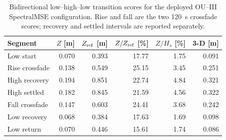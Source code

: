 \begin{table}[t]
  \centering
  \caption{Bidirectional low--high--low transition scores for the deployed OU--III SpectralMSE configuration. Rise and fall are the two \SI{120}{s} crossfade scores; recovery and settled intervals are reported separately.}
  \label{tab:ou-roundtrip-scores}
  \footnotesize
  \setlength{\tabcolsep}{2.7pt}
  \begin{tabular}{@{}lrrrrr@{}}
    \toprule
    Segment & $Z$ [m] & $Z_{\rm ref}$ [m] & $Z/Z_{\rm ref}$ [\%] & $Z/H_s$ [\%] & 3-D [m] \\
    \midrule
    Low start & 0.070 & 0.393 & 17.77 & 1.75 & 0.091 \\
    Rise crossfade & 0.138 & 0.549 & 25.15 & 3.45 & 0.251 \\
    High recovery & 0.194 & 0.851 & 22.74 & 4.84 & 0.321 \\
    High settled & 0.182 & 0.845 & 21.59 & 4.56 & 0.322 \\
    Fall crossfade & 0.147 & 0.603 & 24.41 & 3.68 & 0.242 \\
    Low recovery & 0.068 & 0.384 & 17.63 & 1.69 & 0.098 \\
    Low return & 0.070 & 0.446 & 15.61 & 1.74 & 0.086 \\
    \bottomrule
  \end{tabular}
\end{table}
